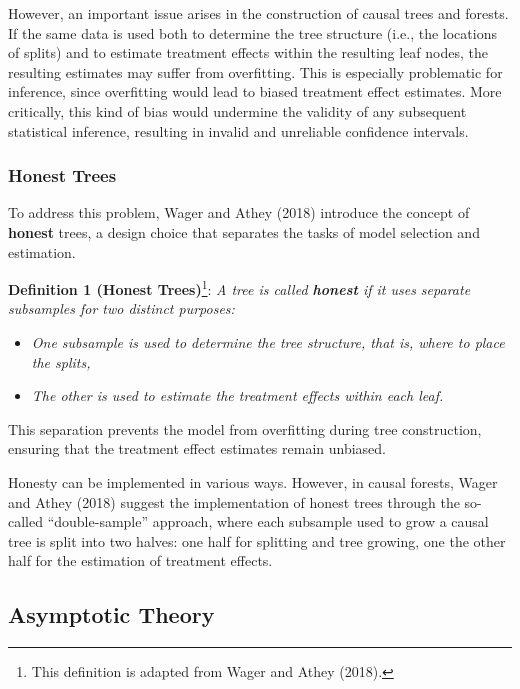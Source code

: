 \documentclass[
  12pt,
  a4paper,
  oneside]{article}
\begin{document}
\qquad However, an important issue arises in the construction of causal
trees and forests. If the same data is used both to determine the tree
structure (i.e., the locations of splits) and to estimate treatment
effects within the resulting leaf nodes, the resulting estimates may
suffer from overfitting. This is especially problematic for inference,
since overfitting would lead to biased treatment effect estimates. More
critically, this kind of bias would undermine the validity of any
subsequent statistical inference, resulting in invalid and unreliable
confidence intervals.

\subsubsection{Honest Trees}\label{honest-trees}

To address this problem, Wager and Athey (2018) introduce the concept of
\textbf{honest} trees, a design choice that separates the tasks of model
selection and estimation.

\textbf{Definition 1 (Honest Trees)}\footnote{This definition is adapted
  from Wager and Athey (2018).}:
\textit{A tree is called \textbf{honest} if it uses separate subsamples for two distinct purposes:}

\begin{itemize}
\item
  \textit{One subsample is used to
  determine the tree
  structure, that is, where
  to place the splits,}
\item
  \textit{The other is used to
  estimate the treatment
  effects within each leaf.}
\end{itemize}

This separation prevents the model from overfitting during tree
construction, ensuring that the treatment effect estimates remain
unbiased.

\qquad Honesty can be implemented in various ways. However, in causal
forests, Wager and Athey (2018) suggest the implementation of honest
trees through the so-called ``double-sample'' approach, where each
subsample used to grow a causal tree is split into two halves: one half
for splitting and tree growing, one the other half for the estimation of
treatment effects.

\subsection{Asymptotic Theory}\label{asymptotic-theory}
\end{document}
